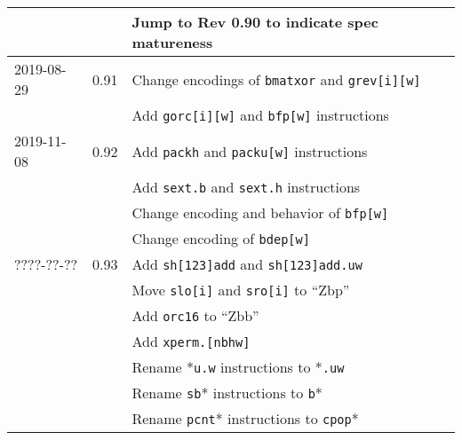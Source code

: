 \documentclass[twoside,11pt]{book}
\begin{document}
\begin{center}
\begin{tabular}{lll}
           &      & Jump to Rev 0.90 to indicate spec matureness \\
\hline
2019-08-29 & 0.91 & Change encodings of {\tt bmatxor} and {\tt grev[i][w]} \\
	   &      & Add {\tt gorc[i][w]} and {\tt bfp[w]} instructions \\
\hline
2019-11-08 & 0.92 & Add {\tt packh} and {\tt packu[w]} instructions \\
	   &      & Add {\tt sext.b} and {\tt sext.h} instructions \\
	   &      & Change encoding and behavior of {\tt bfp[w]} \\
	   &      & Change encoding of {\tt bdep[w]} \\
\hline
????-??-?? & 0.93 & Add {\tt sh[123]add} and {\tt sh[123]add.uw} \\
	   &      & Move {\tt slo[i]} and {\tt sro[i]} to ``Zbp'' \\
	   &      & Add {\tt orc16} to ``Zbb'' \\
	   &      & Add {\tt xperm.[nbhw]} \\
	   &      & Rename *{\tt u.w} instructions to *{\tt .uw} \\
	   &      & Rename {\tt sb}* instructions to {\tt b}* \\
	   &      & Rename {\tt pcnt}* instructions to {\tt cpop}* \\
\hline
\end{tabular}
\end{center}



\end{document}
